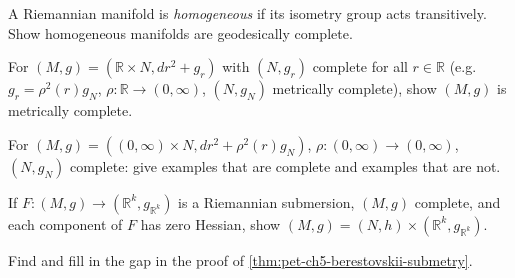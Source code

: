 \begin{remark}
  \label{rem:pet-ch5-ex-9}

  A Riemannian manifold is \emph{homogeneous} if its isometry group acts
  transitively. Show homogeneous manifolds are geodesically complete.
\end{remark}

\begin{remark}
  \label{rem:pet-ch5-ex-10}

  For $(M,g)=(\mathbb R\times N,dr^2+g_r)$ with $(N,g_r)$ complete for all
  $r\in\mathbb R$ (e.g.\ $g_r=\rho^2(r)g_N$, $\rho:\mathbb R\to(0,\infty)$, $(N,g_N)$
  metrically complete), show $(M,g)$ is metrically complete.
\end{remark}

\begin{remark}
  \label{rem:pet-ch5-ex-11}

  For $(M,g)=((0,\infty)\times N,dr^2+\rho^2(r)g_N)$, $\rho:(0,\infty)\to
  (0,\infty)$, $(N,g_N)$ complete: give examples that are complete and examples
  that are not.
\end{remark}

\begin{remark}
  \label{rem:pet-ch5-ex-12}

  If $F:(M,g)\to(\mathbb R^k,g_{\mathbb R^k})$ is a Riemannian submersion, $(M,g)$
  complete, and each component of $F$ has zero Hessian, show
  $(M,g)=(N,h)\times(\mathbb R^k,g_{\mathbb R^k})$.
\end{remark}

\begin{remark}
  \label{rem:pet-ch5-ex-13}

  Find and fill in the gap in the proof of \cref{thm:pet-ch5-berestovskii-submetry}.
\end{remark}

